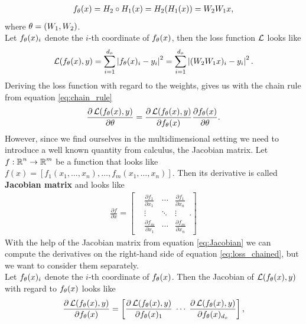 \begin{example}
\begin{enumerate}
\begin{align*}
f_{\theta}(x) = H_2 \circ H_1 (x) = H_2(H_1(x)) = W_2 W_1 x,
\end{align*}
where $\theta = (W_1, W_2)$.\\
Let $f_{\theta}(x)_i$ denote the $i$-th coordinate of $f_{\theta}(x)$, then the loss function $\operatorname{\mathcal{L}}$ looks like
\begin{align*}
\operatorname{\mathcal{L}}(f_{\theta}(x), y) = \sum_{i=1}^{d_o}\left| f_{\theta}(x)_i - y_i \right|^2 = \sum_{i=1}^{d_o}\left| (W_2 W_1 x)_i - y_i \right|^2.
\end{align*}
Deriving the loss function with regard to the weights, gives us with the chain rule from equation \eqref{eq:chain_rule}
\begin{align}\label{eq:loss_chained}
\frac{\partial \operatorname{\mathcal{L}}(f_{\theta}(x), y)}{\partial \theta} = \frac{\partial \operatorname{\mathcal{L}}(f_{\theta}(x), y)}{\partial f_{\theta}(x)} \frac{\partial f_{\theta}(x)}{\partial \theta}.
\end{align}
However, since we find ourselves in the multidimensional setting we need to introduce a well known quantity from calculus, the Jacobian matrix. Let $f:\operatorname{\mathbb{R}}^n \to \operatorname{\mathbb{R}}^m$ be a function that looks like $f(x) = [f_1(x_1,\ldots,x_n), \ldots, f_m(x_1,\ldots,x_n)]$. Then its derivative is called \textbf{Jacobian matrix} and looks like
\begin{align}\label{eq:Jacobian}
\frac{\partial f}{\partial x} = \left[
\begin{matrix}
&\frac{\partial f_1}{\partial x_1} &\cdots &\frac{\partial f_1}{\partial x_n}\\
&\vdots & \ddots &\vdots\\
&\frac{\partial f_m}{\partial x_1} &\cdots &\frac{\partial f_m}{\partial x_n}
\end{matrix}.
\right]
\end{align}
With the help of the Jacobian matrix from equation \eqref{eq:Jacobian} we can compute the derivatives on the right-hand side of equation \eqref{eq:loss_chained}, but we want to consider them separately.\\
Let $f_\theta(x)_i$ denote the $i$-th coordinate of $f_\theta(x)$. Then the Jacobian of $\operatorname{\mathcal{L}}(f_{\theta}(x), y)$ with regard to $f_{\theta}(x)$ looks like
\begin{align*}
\frac{\partial \loss(f_{\t}(x), y)}{\partial f_{\t}(x)} =
\left[\begin{matrix}
\displaystyle\frac{\partial \loss(f_{\t}(x), y)}{\partial f_{\t}(x)_1}\; \cdots\; \frac{\partial \loss(f_{\t}(x), y)}{\partial f_{\t}(x)_{d_o}}
\end{matrix} \right],

\end{align*}
\end{enumerate}
\end{example}
